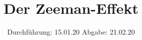 

\subject{V27}
\title{Der Zeeman-Effekt}
\date{%
  Durchführung: 15.01.20
  \hspace{3em}
  Abgabe: 21.02.20
}



\maketitle
\thispagestyle{empty}
\tableofcontents
\newpage







\printbibliography{}


